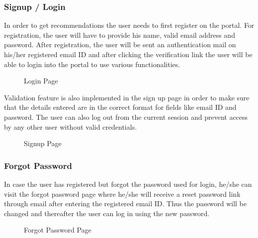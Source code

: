 \documentclass[conference]{IEEEtran}
\begin{document}
\subsubsection{Signup / Login}
In order to get recommendations the user needs to first register on the portal. For registration, the user will have to provide his name, valid email address and password. After registration, the user will be sent an authentication mail on his/her registered email ID and after clicking the verification link the user will be able to login into the portal to use various functionalities. 
\begin{figure}[h!]
\centering
{}
\caption{Login Page}
\end{figure}
Validation feature is also implemented in the sign up page in order to make sure that the details entered are in the correct format for fields like email ID and password. The user can also log out from the current session and prevent access by any other user without valid credentials.
\begin{figure}[h!]
\centering
{}
\caption{Signup Page}
\end{figure}
\subsubsection{Forgot Password}
In case the user has registered but forgot the password used for login, he/she can visit the forgot password page where he/she will receive a reset password link through email after entering the registered email ID. Thus the password will be changed and thereafter the user can log in using the new password.

\begin{figure}[h!]
\centering
{}
\caption{Forgot Password Page}
\end{figure}
\end{document}
